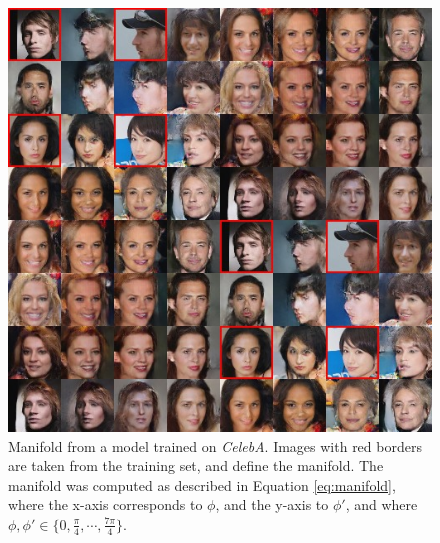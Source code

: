 \documentclass{article}
\begin{document}
\begin{figure}[H]
\vspace{80pt}
    \centering \includegraphics[width=1.\textwidth]{celeba_manifold_highlight.jpg}
    \caption{Manifold from a model trained on \emph{CelebA}. Images with red borders are taken from the training set, and define the manifold. The manifold was computed as described in Equation \ref{eq:manifold}, where the x-axis corresponds to $\phi$, and the y-axis to $\phi'$, and where $\phi, \phi' \in \{0, \frac{\pi}{4}, \cdots, \frac{7\pi}{4}\}$. }
\end{figure}
\end{document}

